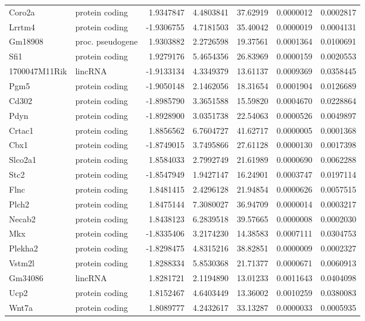 \documentclass[onehalf,12pt]{beavtex}
\begin{document}
\begin{longtable}{llrrrrr}
  Coro2a & protein coding & 1.9347847 & 4.4803841 & 37.62919 & 0.0000012 & 0.0002817\\
  Lrrtm4 & protein coding & -1.9306755 & 4.7181503 & 35.40042 & 0.0000019 & 0.0004131\\
  Gm18908 & proc. pseudogene & 1.9303882 & 2.2726598 & 19.37561 & 0.0001364 & 0.0100691\\
  Sfi1 & protein coding & 1.9279176 & 5.4654356 & 26.83969 & 0.0000159 & 0.0020553\\
  \addlinespace
  1700047M11Rik & lincRNA & -1.9133134 & 4.3349379 & 13.61137 & 0.0009369 & 0.0358445\\
  Pgm5 & protein coding & -1.9050148 & 2.1462056 & 18.31654 & 0.0001904 & 0.0126689\\
  Cd302 & protein coding & -1.8985790 & 3.3651588 & 15.59820 & 0.0004670 & 0.0228864\\
  Pdyn & protein coding & -1.8928900 & 3.0351738 & 22.54063 & 0.0000526 & 0.0049897\\
  Crtac1 & protein coding & 1.8856562 & 6.7604727 & 41.62717 & 0.0000005 & 0.0001368\\
  \addlinespace
  Cbx1 & protein coding & -1.8749015 & 3.7495866 & 27.61128 & 0.0000130 & 0.0017398\\
  Slco2a1 & protein coding & 1.8584033 & 2.7992749 & 21.61989 & 0.0000690 & 0.0062288\\
  Stc2 & protein coding & -1.8547949 & 1.9427147 & 16.24901 & 0.0003747 & 0.0197114\\
  Flnc & protein coding & 1.8481415 & 2.4296128 & 21.94854 & 0.0000626 & 0.0057515\\
  Plch2 & protein coding & 1.8475144 & 7.3080027 & 36.94709 & 0.0000014 & 0.0003217\\
  \addlinespace
  Necab2 & protein coding & 1.8438123 & 6.2839518 & 39.57665 & 0.0000008 & 0.0002030\\
  Mkx & protein coding & -1.8335406 & 3.2174230 & 14.38583 & 0.0007111 & 0.0304753\\
  Plekha2 & protein coding & -1.8298475 & 4.8315216 & 38.82851 & 0.0000009 & 0.0002327\\
  Vstm2l & protein coding & 1.8288334 & 5.8530368 & 21.71377 & 0.0000671 & 0.0060913\\
  Gm34086 & lincRNA & 1.8281721 & 2.1194890 & 13.01233 & 0.0011643 & 0.0404098\\
  \addlinespace
  Ucp2 & protein coding & 1.8152467 & 4.6403449 & 13.36002 & 0.0010259 & 0.0380083\\
  Wnt7a & protein coding & 1.8089777 & 4.2432617 & 33.13287 & 0.0000033 & 0.0005935\\

\end{longtable}
\end{document}
